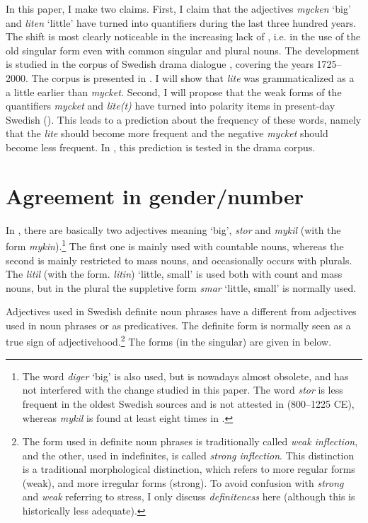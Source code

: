 \documentclass[output=paper]{langscibook}
\begin{document}
In this paper, I make two claims. First, I claim that the adjectives \textit{mycken} ‘big’ and \textit{liten} ‘little’ have turned into quantifiers during the last three hundred years. The shift is most clearly noticeable in the increasing lack of , i.e. in the use of the old  singular form even with common  singular and plural nouns. The development is studied in the corpus of Swedish drama dialogue \citep{MarttalaStromquist2001}, covering the years 1725–2000. The corpus is presented in . I will show that \textit{lite} was grammaticalized as a  a little earlier than \textit{mycket.} Second, I will propose that the weak forms of the quantifiers \textit{mycket} and \textit{lite(t)} have turned into polarity items in present-day Swedish (). This leads to a prediction about the frequency of these words, namely that the  \textit{lite} should become more frequent and the negative  \textit{mycket} should become less frequent. In , this prediction is tested in the drama corpus.


\section{Agreement in gender/number}\label{sec:delsing:2}


In , there are basically two adjectives meaning ‘big’, \textit{stor} and \textit{mykil} (with the   form \textit{mykin}).\footnote{The word \textit{diger} ‘big’ is also used, but  is nowadays almost obsolete, and has not interfered with the change studied in this paper. The word \textit{stor} is less frequent in the oldest Swedish sources and is not attested in  (800–1225 CE), whereas \textit{mykil} is found at least eight times in  \citep{Peterson2006}.}  The first one is mainly used with countable nouns, whereas the second is mainly restricted to mass nouns, and occasionally occurs with plurals. The  \textit{litil} (with the   form. \textit{litin}) ‘little, small’ is used both with count and mass nouns, but in the plural the suppletive form \textit{smar} ‘little, small’ is normally used.



Adjectives used in Swedish definite noun phrases have a different  from adjectives used in  noun phrases or as predicatives. The definite form is normally seen as a true sign of adjectivehood.\footnote{The form used in definite noun phrases is traditionally called \textit{weak inflection}, and the other, used in indefinites, is called \textit{strong inflection}. This distinction is a traditional morphological distinction, which refers to more regular forms (weak), and more irregular forms (strong). To avoid confusion with \textit{strong} and \textit{weak} referring to stress, I only discuss \textit{definiteness} here (although this is historically less adequate).} The forms (in the  singular) are given in  below.
\end{document}
